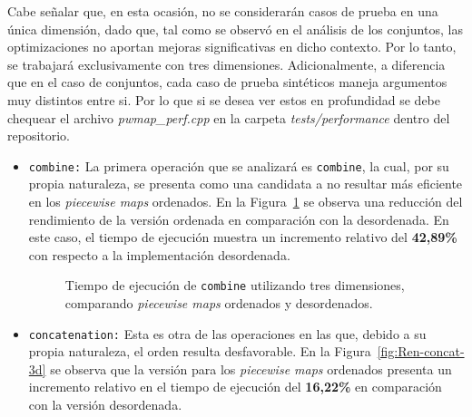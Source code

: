 Cabe señalar que, en esta ocasión, no se considerarán casos de prueba en una única 
dimensión, dado que, tal como se observó en el análisis de los conjuntos, las 
optimizaciones no aportan mejoras significativas en dicho contexto. Por lo tanto, 
se trabajará exclusivamente con tres dimensiones. Adicionalmente, a diferencia que en el caso de conjuntos, cada caso de prueba sintéticos maneja argumentos muy distintos entre si. Por lo que si se desea ver estos en profundidad se debe chequear el archivo \textit{pwmap\_perf.cpp} en la carpeta \textit{tests/performance} dentro del repositorio. 

\begin{itemize}
   \item \texttt{combine:} 
La primera operación que se analizará es \texttt{combine}, la cual, por su propia 
naturaleza, se presenta como una candidata a no resultar más eficiente en los 
\textit{piecewise maps} ordenados. En la Figura~\ref{fig:Ren-com-3d} se observa una reducción del rendimiento de la versión ordenada en comparación con la desordenada. 
En este caso, el tiempo de ejecución muestra un incremento relativo del 
\textbf{42{,}89\%} con respecto a la implementación desordenada.

   \begin{figure}[htbp]
          \centering
          \caption{Tiempo de ejecución de \texttt{combine} utilizando tres dimensiones, comparando \textit{piecewise maps} ordenados y desordenados.}
          \label{fig:Ren-com-3d}
        \end{figure}


       \item \texttt{concatenation:} 
        Esta es otra de las operaciones en las que, debido a su propia naturaleza, 
        el orden resulta desfavorable. En la Figura~\ref{fig:Ren-concat-3d} 
        se observa que la versión para los \textit{piecewise maps} ordenados 
        presenta un incremento relativo en el tiempo de ejecución del 
        \textbf{16{,}22\%} en comparación con la versión desordenada.



\end{itemize}
